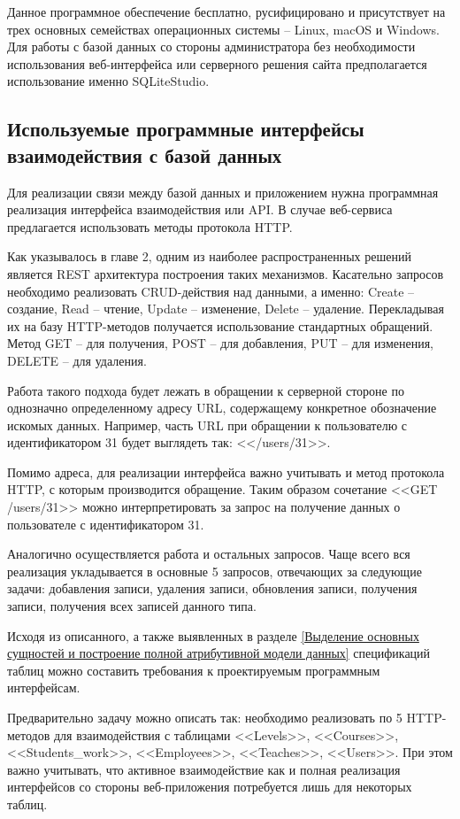 Данное программное обеспечение бесплатно, русифицировано и присутствует на трех основных семействах операционных системы -- Linux, macOS и Windows.
Для работы с базой данных со стороны администратора без необходимости использования веб-интерфейса или серверного решения сайта предполагается использование именно SQLiteStudio.


\subsection{Используемые программные интерфейсы взаимодействия с базой данных}

Для реализации связи между базой данных и приложением нужна программная реализация интерфейса взаимодействия или API.
В случае веб-сервиса предлагается использовать методы протокола HTTP.

Как указывалось в главе 2, одним из наиболее распространенных решений является REST архитектура построения таких механизмов.
Касательно запросов необходимо реализовать CRUD-действия над данными, а именно: Create -- создание, Read -- чтение, Update -- изменение, Delete -- удаление.
Перекладывая их на базу HTTP-методов получается использование стандартных обращений.
Метод GET -- для получения, POST -- для добавления, PUT -- для изменения, DELETE -- для удаления.

Работа такого подхода будет лежать в обращении к серверной стороне по однозначно определенному адресу URL, содержащему конкретное обозначение искомых данных.
Например, часть URL при обращении к пользователю с идентификатором 31 будет выглядеть так: <</users/31>>.

Помимо адреса, для реализации интерфейса важно учитывать и метод протокола HTTP, с которым производится обращение.
Таким образом сочетание <<GET /users/31>> можно интерпретировать за запрос на получение данных о пользователе с идентификатором 31.

Аналогично осуществляется работа и остальных запросов.
Чаще всего вся реализация укладывается в основные 5 запросов, отвечающих за следующие задачи: добавления записи, удаления записи, обновления записи, получения записи, получения всех записей данного типа.

Исходя из описанного, а также выявленных в разделе \ref{Выделение основных сущностей и построение полной атрибутивной модели данных} спецификаций таблиц можно составить требования к проектируемым программным интерфейсам.

Предварительно задачу можно описать так: необходимо реализовать по 5 HTTP-методов для взаимодействия с таблицами <<Levels>>, <<Courses>>, <<Students\_work>>, <<Employees>>, <<Teaches>>, <<Users>>.
При этом важно учитывать, что активное взаимодействие как и полная реализация интерфейсов со стороны веб-приложения потребуется лишь для некоторых таблиц.

